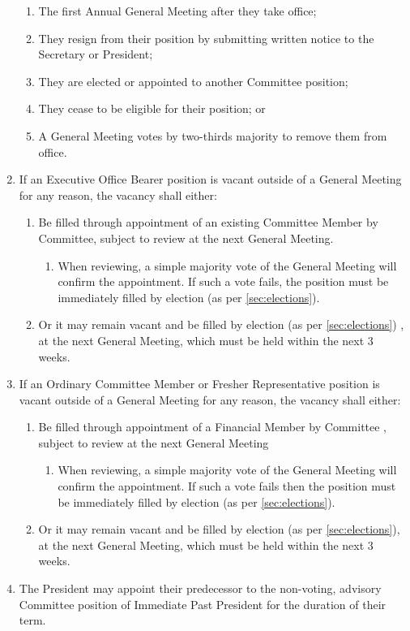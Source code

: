 \documentclass[a4paper]{article}
\begin{document}
\begin{enumerate}
\begin{enumerate}
              \item The first Annual General Meeting after they take office;
              \item They resign from their position by submitting written notice to the Secretary or President;
              \item They are elected or appointed to another Committee position;
              \item They cease to be eligible for their position; or
              \item A General Meeting votes by two-thirds majority to remove them from office.
          \end{enumerate}
    \item If an Executive Office Bearer position is vacant outside of a General Meeting for any reason, the vacancy shall either:
          \begin{enumerate}
              \item Be filled through appointment of an existing Committee Member by Committee, subject to review at the next General Meeting.
                    \begin{enumerate}
                        \item When reviewing, a simple majority vote of the General Meeting will confirm the appointment. If such a vote fails, the position must be immediately filled by election (as per \cref{sec:elections}).
                    \end{enumerate}
              \item Or it may remain vacant and be filled by election (as per \cref{sec:elections}) , at the next General Meeting, which must be held within the next 3 weeks.
          \end{enumerate}
    \item If an Ordinary Committee Member or Fresher Representative position is vacant outside of a General Meeting for any reason, the vacancy shall either:
          \begin{enumerate}
              \item Be filled through appointment of a Financial Member by Committee , subject to review at the next General Meeting
                    \begin{enumerate}
                        \item When reviewing, a simple majority vote of the General Meeting will confirm the appointment. If such a vote fails then the position must be immediately filled by election (as per \cref{sec:elections}).
                    \end{enumerate}
              \item Or it may remain vacant and be filled by election (as per \cref{sec:elections}), at the next General Meeting, which must be held within the next 3 weeks.
          \end{enumerate}
    \item The President may appoint their predecessor to the non-voting, advisory Committee position of Immediate Past President for the duration of their term.
\end{enumerate}
\end{document}
